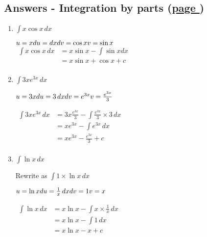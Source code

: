 \documentclass[../main.tex]{subfiles}
\begin{document}
\hypertarget{integrationbypartsanswers}{\subsection*{Answers - Integration by parts (\hyperlink{integrationbypartslink}{page \pageref{Integration by parts}})}}

\label{Integration by parts answers}

\begin{enumerate}
    \item \(\int x\cos{x} \, dx\)
    
    \(u=x\\
    du=dx\\
    dv=\cos{x}\\
    v=\sin{x}\)\\
    $
    \!
    \begin{aligned}
        \int x\cos{x} \, dx 
        &= x\sin{x}-\int \sin{x} dx\\
        &=x\sin{x}+\cos{x}+c\\
    \end{aligned}
    $

    \item \(\int 3xe^{3x}\, dx\)
    
    \(u=3x\\
    du=3\,dx\\
    dv=e^{3x}\\
    v=\frac{e^{3x}}{3}\)

    $
    \!
    \begin{aligned}
        \int 3xe^{3x}\, dx 
        &=3x\frac{e^{3x}}{3}-\int \frac{e^{3x}}{3}\times 3 \,dx\\
        &=xe^{3x}-\int e^{3x}\, dx\\
        &=xe^{3x}-\frac{e^{3x}}{3}+c\\
    \end{aligned}
    $

    \item \(\int \ln{x}\, dx\)
    
    Rewrite as \(\int 1\times \ln{x}\, dx\)

    \(u=\ln{x}\\
    du=\frac{1}{x}\,dx\\
    dv=1\\
    v=x\)

    $
    \!
    \begin{aligned}
        \int \ln{x}\, dx
        &=x\ln{x}-\int x\times \frac{1}{x}\, dx\\
        &=x\ln{x}-\int 1\, dx\\
        &=x\ln{x}-x+c\\
    \end{aligned}
    $


\end{enumerate}
\end{document}
